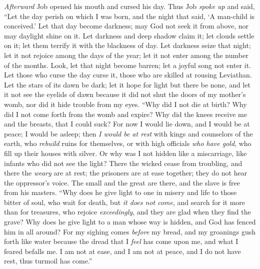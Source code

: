 \begin{biblechapter} %
 \textit{Afterward} Job opened his mouth and cursed his day.
\verse Thus Job \textit{spoke up} and said,
\verse “Let the day perish on which I was born, 
and the night that said, ‘A man-child is conceived.’
\verse Let that day become darkness; 
may God not seek it from above, 
nor may daylight shine on it.
\verse Let darkness and deep shadow claim it; 
let clouds settle on it; 
let them terrify it with the blackness of day.
\verse Let darkness seize that night; 
let it not rejoice among the days of the year; 
let it not enter among the number of the months.
\verse Look, let that night become barren; 
let a joyful song not enter it.
\verse Let those who curse the day curse it, 
those who are skilled at rousing Leviathan.
\verse Let the stars of its dawn be dark; 
let it hope for light but there be none, 
and let it not see the eyelids of dawn
\verse because it did not shut the doors of my mother’s womb, 
nor did it hide trouble from my eyes.
 “Why did I not die at birth? 
Why did I not come forth from the womb and expire?
\verse Why did the knees receive me 
and the breasts, that I could suck?
\verse For now I would lie down, and I would be at peace; 
I would be asleep; then \textit{I would be at rest}
\verse with kings and counselors of the earth, 
who \textit{rebuild}  ruins for themselves,
\verse or with high officials \textit{who have gold}, 
who fill up their houses with silver.
\verse Or why was I not hidden like a miscarriage, 
like infants who did not see the light?
\verse There the wicked cease from troubling, 
and there the \textit{weary} are at rest;
\verse the prisoners are at ease together; 
they do not hear the oppressor’s voice.
\verse The small and the great are there, 
and the slave is free from his masters.
 “Why does he give light to one in misery 
and life to those bitter of soul,
\verse who wait for death, but \textit{it does not come}, 
and search for it more than for treasures,
\verse who rejoice \textit{exceedingly}, 
and they are glad when they find the grave?
\verse Why does he give light to a man whose way is hidden, 
and God has fenced him in all around?
\verse For my sighing comes \textit{before} my bread, 
and my groanings gush forth like water
\verse because the dread that I \textit{feel} has come upon me, 
and what I feared befalls me.
\verse I am not at ease, and I am not at peace, 
and I do not have rest, thus turmoil has come.”
\end{biblechapter}

